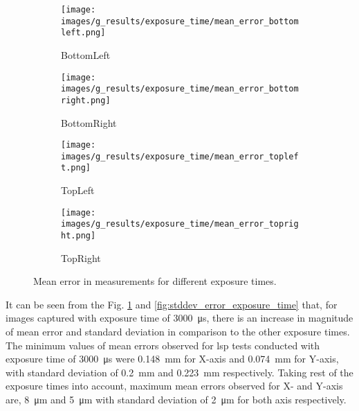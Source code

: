     \begin{figure}[ht]
        \centering
        \begin{subfigure}[b]{0.46\textwidth}
            \centering
            \texttt{[image: images/g\_results/exposure\_time/mean\_error\_bottomleft.png]}
            \caption{\textsf{BottomLeft}}
        \end{subfigure}
        \hspace{1cm}
        \begin{subfigure}[b]{0.46\textwidth}
            \centering
            \texttt{[image: images/g\_results/exposure\_time/mean\_error\_bottomright.png]}
            \caption{\textsf{BottomRight}}
        \end{subfigure}

        \vspace{5mm}
        
        \begin{subfigure}[b]{0.46\textwidth}
            \centering
            \texttt{[image: images/g\_results/exposure\_time/mean\_error\_topleft.png]}
            \caption{\textsf{TopLeft}}
        \end{subfigure}
        \hspace{1cm}
        \begin{subfigure}[b]{0.46\textwidth}
            \centering
            \texttt{[image: images/g\_results/exposure\_time/mean\_error\_topright.png]}
            \caption{\textsf{TopRight}}
        \end{subfigure}

        \caption{Mean error in measurements for different exposure times.}
        \label{fig:mean_error_exposure_time}
    \end{figure}

    \vspace{5mm}
    \noindent It can be seen from the Fig. \ref{fig:mean_error_exposure_time} and \ref{fig:stddev_error_exposure_time} that, for images captured with exposure time of \SI{3000}{\micro\second}, there is an increase in magnitude of mean error and standard deviation in comparison to the other exposure times. The minimum values of mean errors observed for \gls{lsp} tests conducted with exposure time of \SI{3000}{\micro\second} were \SI{0.148}{\milli\meter} for X-axis and \SI{0.074}{\milli\meter} for Y-axis, with standard deviation of \SI{0.2}{\milli\meter} and \SI{0.223}{\milli\meter} respectively. Taking rest of the exposure times into account, maximum mean errors observed for X- and Y-axis are, \SI{8}{\micro\meter} and \SI{5}{\micro\meter} with standard deviation of \SI{2}{\micro\meter} for both axis respectively. 


